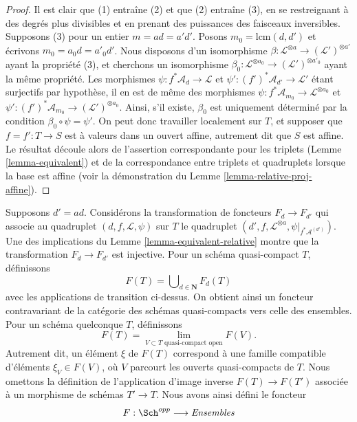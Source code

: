 \begin{proof}
Il est clair que (1) entraîne (2) et que
(2) entraîne (3), en se restreignant
à des degrés plus divisibles et en prenant des puissances des faisceaux
inversibles. Supposons (3) pour un entier $m = ad = a'd'$.
Posons $m_0 = \text{lcm}(d, d')$ et écrivons $m_0 = a_0d = a'_0d'$.
Nous disposons d'un isomorphisme
$\beta : \mathcal{L}^{\otimes a} \to (\mathcal{L}')^{\otimes a'}$
ayant la propriété (3), et cherchons un isomorphisme
$\beta_0 : \mathcal{L}^{\otimes a_0} \to (\mathcal{L}')^{\otimes a'_0}$
ayant la même propriété. Les morphismes
$\psi : f^*\mathcal{A}_d \to \mathcal{L}$ et
$\psi' : (f')^*\mathcal{A}_{d'} \to \mathcal{L}'$ étant surjectifs par
hypothèse, il en est de même des morphismes
$\psi : f^*\mathcal{A}_{m_0} \to \mathcal{L}^{\otimes a_0}$ et
$\psi' : (f')^*\mathcal{A}_{m_0} \to (\mathcal{L}')^{\otimes a_0}$.
Ainsi, s'il existe, $\beta_0$ est uniquement déterminé par la condition
$\beta_0 \circ \psi = \psi'$. On peut donc travailler localement sur $T$,
et supposer que $f = f' : T \to S$ est à valeurs dans un ouvert affine,
autrement dit que $S$ est affine. Le résultat découle alors de l'assertion
correspondante pour les triplets (Lemme \ref{lemma-equivalent}) et de la
correspondance entre triplets et quadruplets lorsque la base est affine
(voir la démonstration du Lemme \ref{lemma-relative-proj-affine}).
\end{proof}

\noindent
Supposons $d' = ad$. Considérons la transformation de foncteurs
$F_d \to F_{d'}$ qui associe au quadruplet $(d, f, \mathcal{L}, \psi)$ sur
$T$ le quadruplet
$(d', f, \mathcal{L}^{\otimes a}, \psi|_{f^*\mathcal{A}^{(d')}})$.
Une des implications du Lemme \ref{lemma-equivalent-relative} montre que
la transformation $F_d \to F_{d'}$ est
injective. Pour un schéma quasi-compact $T$,
définissons
$$
F(T) = \bigcup\nolimits_{d \in \mathbf{N}} F_d(T)
$$
avec les applications de transition ci-dessus. On obtient ainsi un foncteur
contravariant de la catégorie des schémas quasi-compacts vers celle des
ensembles. Pour un schéma quelconque $T$, définissons
$$
F(T)
=
\lim_{V \subset T\text{ quasi-compact open}} F(V).
$$
Autrement dit, un élément $\xi$ de $F(T)$ correspond à une famille
compatible d'éléments $\xi_V \in F(V)$, où $V$ parcourt les ouverts
quasi-compacts de $T$. Nous omettons
la définition de l'application d'image
inverse $F(T) \to F(T')$ associée à un morphisme de schémas $T' \to T$.
Nous avons ainsi défini le foncteur
\begin{equation}
\label{equation-proj}
F : \Sch^{opp} \longrightarrow \textit{Ensembles}
\end{equation}

